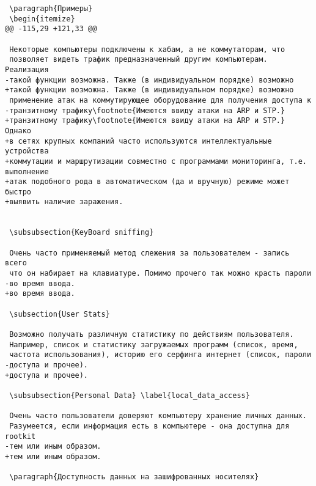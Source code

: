 \begin{verbatim}
 \paragraph{Примеры}
 \begin{itemize}
@@ -115,29 +121,33 @@

 Некоторые компьютеры подключены к хабам, а не коммутаторам, что
 позволяет видеть трафик предназначенный другим компьютерам. Реализация
-такой функции возможна. Также (в индивидуальном порядке) возможно
+такой функции возможна. Также (в индивидуальном порядке) возможно
 применение атак на коммутирующее оборудование для получения доступа к
-транзитному трафику\footnote{Имеются ввиду атаки на ARP и STP.}
+транзитному трафику\footnote{Имеются ввиду атаки на ARP и STP.} Однако
+в сетях крупных компаний часто используются интеллектуальные устройства
+коммутации и маршрутизации совместно с программами мониторинга, т.е. выполнение
+атак подобного рода в автоматическом (да и вручную) режиме может быстро
+выявить наличие заражения.


 \subsubsection{KeyBoard sniffing}

 Очень часто применяемый метод слежения за пользователем - запись всего
 что он набирает на клавиатуре. Помимо прочего так можно красть пароли
-во время ввода.
+во время ввода.

 \subsection{User Stats}

 Возможно получать различную статистику по действиям пользователя.
 Например, список и статистику загружаемых программ (список, время,
 частота использования), историю его серфинга интернет (список, пароли
-доступа и прочее).
+доступа и прочее).

 \subsubsection{Personal Data} \label{local_data_access}

 Очень часто пользователи доверяют компьютеру хранение личных данных.
 Разумеется, если информация есть в компьютере - она доступна для rootkit
-тем или иным образом.
+тем или иным образом.

 \paragraph{Доступность данных на зашифрованных носителях}


\end{verbatim}
